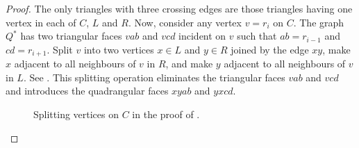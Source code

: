 \documentclass{patmorin}
\begin{document}
\begin{proof}
   The only triangles with three crossing edges are those triangles
   having one vertex in each of $C$, $L$ and $R$.  Now, consider any
   vertex $v=r_i$ on $C$.  The graph $Q^*$ has two triangular faces $vab$
   and $vcd$ incident on $v$ such that $ab=r_{i-1}$ and $cd=r_{i+1}$.
   Split $v$ into two vertices $x\in L$ and $y\in R$ joined by the edge
   $xy$, make $x$ adjacent to all neighbours of $v$ in $R$, and make
   $y$ adjacent to all neighbours of $v$ in $L$. See .
   This splitting operation eliminates the triangular faces $vab$ and
   $vcd$ and introduces the quadrangular faces $xyab$ and $yxcd$.

   \begin{figure}
      \caption{Splitting vertices on $C$ in the proof of
      .}
   \end{figure}


\end{proof}
\end{document}

